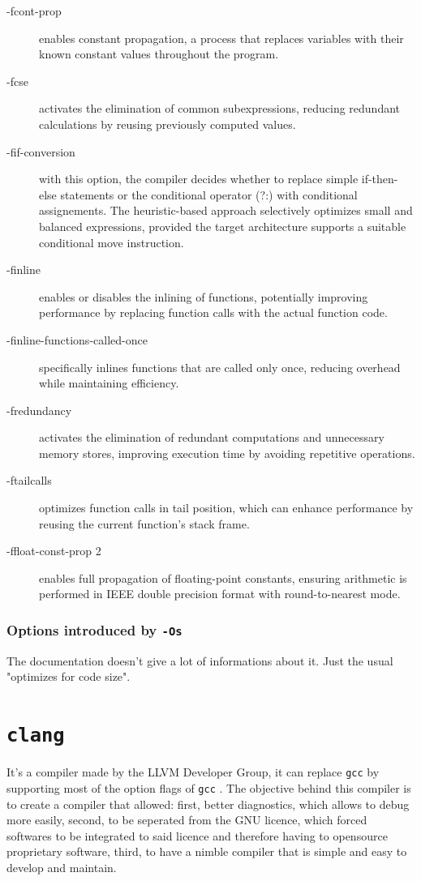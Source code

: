 \documentclass{rapport}
\newcommand{\gcc}{\texttt{gcc} }
\newcommand{\clang}{\texttt{clang} }
\newcommand{\optisize}{\texttt{-Os} }
\begin{document}
\begin{description}
    \item[-fcont-prop] enables constant propagation, a process that replaces variables with their known constant values throughout the program.
    \item[-fcse] activates the elimination of common subexpressions, reducing redundant calculations by reusing previously computed values.
    \item[-fif-conversion] with this option, the compiler decides whether to replace simple if-then-else statements or the conditional operator (?:) with conditional assignements.\newline
    The heuristic-based approach selectively optimizes small and balanced expressions, provided the target architecture supports a suitable conditional move instruction.
    \item[-finline]  enables or disables the inlining of functions, potentially improving performance by replacing function calls with the actual function code.
    \item[-finline-functions-called-once] specifically inlines functions that are called only once, reducing overhead while maintaining efficiency.
    \item[-fredundancy] activates the elimination of redundant computations and unnecessary memory stores, improving execution time by avoiding repetitive operations.
    \item[-ftailcalls] optimizes function calls in tail position, which can enhance performance by reusing the current function’s stack frame. 
    \item[-ffloat-const-prop 2] enables full propagation of floating-point constants, ensuring arithmetic is performed in IEEE double precision format with round-to-nearest mode.
\end{description}

\subsubsection{Options introduced by \optisize}
The documentation doesn't give a lot of informations about it. Just the usual "optimizes for code size".

\section{\clang}
It's a compiler made by the LLVM Developer Group, it can replace \gcc by supporting most of the option flags of \gcc. \newline
The objective behind this compiler is to create a compiler that allowed: first, better diagnostics, which allows to debug more easily, second, to be seperated from the GNU licence, which forced
softwares to be integrated to said licence and therefore having to open\-source proprietary software, third, to have a nimble compiler that is simple and easy to develop and maintain.
\end{document}
